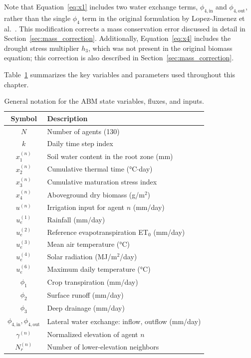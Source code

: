 Note that Equation~\eqref{eq:x1} includes two water exchange terms, $\phi_{4,\text{in}}$ and $\phi_{4,\text{out}}$, rather than the single $\phi_4$ term in the original formulation by Lopez-Jimenez et al.~\cite{Lopezjimenez2024}. This modification corrects a mass conservation error discussed in detail in Section~\ref{sec:mass_correction}. Additionally, Equation~\eqref{eq:x4} includes the drought stress multiplier $h_3$, which was not present in the original biomass equation; this correction is also described in Section~\ref{sec:mass_correction}.

Table~\ref{tab:notation} summarizes the key variables and parameters used throughout this chapter.

\begin{table}[htbp]
\centering
\caption{General notation for the ABM state variables, fluxes, and inputs.}
\label{tab:notation}
\begin{tabular}{cl}
\toprule
\textbf{Symbol} & \textbf{Description} \\
\midrule
$N$ & Number of agents (130) \\
$k$ & Daily time step index \\
$x_1^{(n)}$ & Soil water content in the root zone (mm) \\
$x_2^{(n)}$ & Cumulative thermal time (°C$\cdot$day) \\
$x_3^{(n)}$ & Cumulative maturation stress index \\
$x_4^{(n)}$ & Aboveground dry biomass (g/m$^2$) \\
$u^{(n)}$ & Irrigation input for agent $n$ (mm/day) \\
$u_e^{(1)}$ & Rainfall (mm/day) \\
$u_e^{(2)}$ & Reference evapotranspiration ET$_0$ (mm/day) \\
$u_e^{(3)}$ & Mean air temperature (°C) \\
$u_e^{(4)}$ & Solar radiation (MJ/m$^2$/day) \\
$u_e^{(6)}$ & Maximum daily temperature (°C) \\
$\phi_1$ & Crop transpiration (mm/day) \\
$\phi_2$ & Surface runoff (mm/day) \\
$\phi_3$ & Deep drainage (mm/day) \\
$\phi_{4,\text{in}}, \phi_{4,\text{out}}$ & Lateral water exchange: inflow, outflow (mm/day) \\
$\gamma^{(n)}$ & Normalized elevation of agent $n$ \\
$N_r^{(n)}$ & Number of lower-elevation neighbors \\
\bottomrule
\end{tabular}
\end{table}


